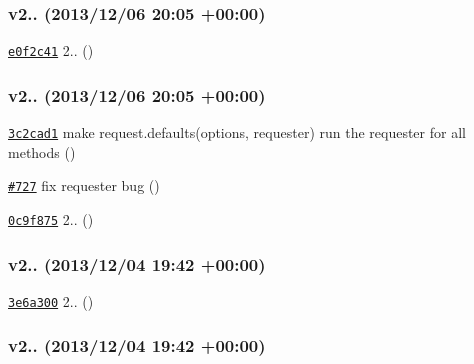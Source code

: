 \subsubsection*{v2.. (2013/12/06 20\+:05 +00\+:00)}


\begin{DoxyItemize}
\item \href{https://github.com/mikeal/request/commit/e0f2c41bd4e15518e97dd2f4c134be51ed4cb68b}{\tt e0f2c41} 2.. ()
\end{DoxyItemize}

\subsubsection*{v2.. (2013/12/06 20\+:05 +00\+:00)}


\begin{DoxyItemize}
\item \href{https://github.com/mikeal/request/commit/3c2cad11301380f4056eb3ca4c0c124f7f7f72f5}{\tt 3c2cad1} make request.\+defaults(options, requester) run the requester for all methods ()
\item \href{https://github.com/mikeal/request/pull/727}{\tt \#727} fix requester bug ()
\item \href{https://github.com/mikeal/request/commit/0c9f87542cd1f919751d3ed1f00208ce7705f8e7}{\tt 0c9f875} 2.. ()
\end{DoxyItemize}

\subsubsection*{v2.. (2013/12/04 19\+:42 +00\+:00)}


\begin{DoxyItemize}
\item \href{https://github.com/mikeal/request/commit/3e6a300121586da81b871f759a9feec52810474a}{\tt 3e6a300} 2.. ()
\end{DoxyItemize}

\subsubsection*{v2.. (2013/12/04 19\+:42 +00\+:00)}


